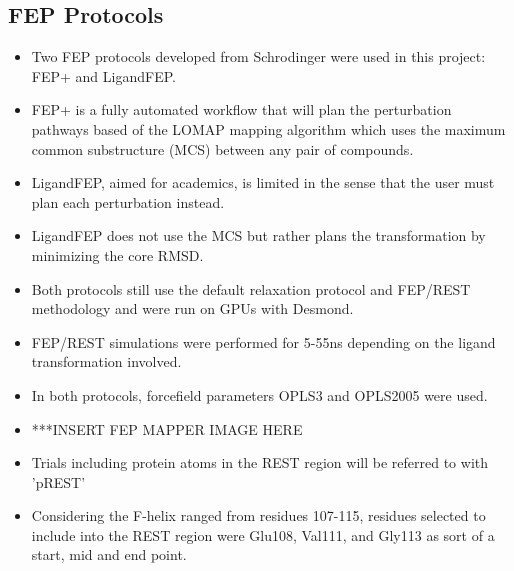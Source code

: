 \documentclass{article}
\begin{document}
\subsection{FEP Protocols}
   \begin{itemize}
   \item Two FEP protocols developed from Schrodinger were used in this project: FEP+ and LigandFEP.
   \item FEP+ is a fully automated workflow that will plan the perturbation pathways based of the LOMAP mapping algorithm which uses the maximum common substructure (MCS) between any pair of compounds.
   \item LigandFEP, aimed for academics, is limited in the sense that the user must plan each perturbation instead. 
   \item LigandFEP does not use the MCS but rather plans the transformation by minimizing the core RMSD.
   \item Both protocols still use the default relaxation protocol and FEP/REST methodology and were run on GPUs with Desmond.
   \item FEP/REST simulations were performed for 5-55ns depending on the ligand transformation involved. 
   \item In both protocols, forcefield parameters OPLS3 and OPLS2005 were used.
   \item ***INSERT FEP MAPPER IMAGE HERE
   \item Trials including protein atoms in the REST region will be referred to with 'pREST'
   \item Considering the F-helix ranged from residues 107-115, residues selected to include into the REST region were Glu108, Val111, and Gly113 as sort of a start, mid and end point. 
   \end{itemize}
\end{document}
